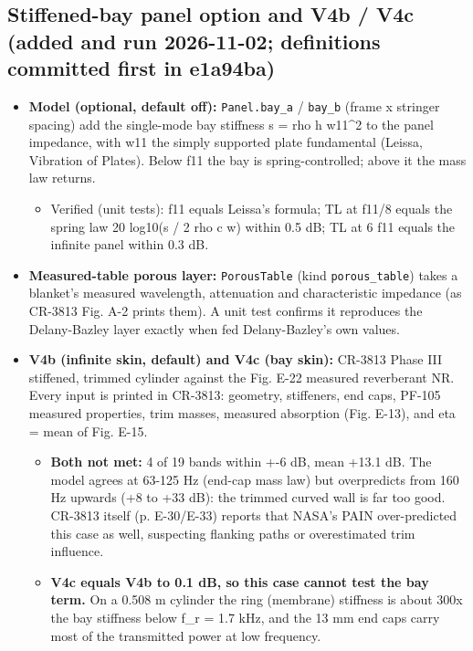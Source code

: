 \documentclass[10pt,a4paper]{article}
\begin{document}
\subsection*{Stiffened-bay panel option and V4b / V4c (added and run 2026-11-02; definitions committed first in e1a94ba)}

\begin{itemize}
\item \textbf{Model (optional, default off):} \texttt{Panel.\allowbreak{}bay\_\allowbreak{}a} / \texttt{bay\_\allowbreak{}b} (frame x stringer spacing) add the single-mode bay stiffness s = rho h w11\textasciicircum{}2 to the panel impedance, with w11 the simply supported plate fundamental (Leissa, Vibration of Plates). Below f11 the bay is spring-controlled; above it the mass law returns.
\begin{itemize}
\item Verified (unit tests): f11 equals Leissa's formula; TL at f11/8 equals the spring law 20 log10(s / 2 rho c w) within 0.5 dB; TL at 6 f11 equals the infinite panel within 0.3 dB.
\end{itemize}
\item \textbf{Measured-table porous layer:} \texttt{PorousTable} (kind \texttt{porous\_\allowbreak{}table}) takes a blanket's measured wavelength, attenuation and characteristic impedance (as CR-3813 Fig. A-2 prints them). A unit test confirms it reproduces the Delany-Bazley layer exactly when fed Delany-Bazley's own values.
\item \textbf{V4b (infinite skin, default) and V4c (bay skin):} CR-3813 Phase III stiffened, trimmed cylinder against the Fig. E-22 measured reverberant NR. Every input is printed in CR-3813: geometry, stiffeners, end caps, PF-105 measured properties, trim masses, measured absorption (Fig. E-13), and eta = mean of Fig. E-15.
\begin{itemize}
\item \textbf{Both not met:} 4 of 19 bands within +-6 dB, mean +13.1 dB. The model agrees at 63-125 Hz (end-cap mass law) but overpredicts from 160 Hz upwards (+8 to +33 dB): the trimmed curved wall is far too good. CR-3813 itself (p. E-30/E-33) reports that NASA's PAIN over-predicted this case as well, suspecting flanking paths or overestimated trim influence.
\item \textbf{V4c equals V4b to 0.1 dB, so this case cannot test the bay term.} On a 0.508 m cylinder the ring (membrane) stiffness is about 300x the bay stiffness below f\_r = 1.7 kHz, and the 13 mm end caps carry most of the transmitted power at low frequency.

\end{itemize}
\end{itemize}
\end{document}
